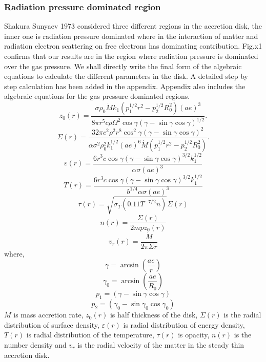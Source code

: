 \documentclass[useAMS,usenatbib]{mn2e}
\begin{document}
\subsubsection{Radiation pressure dominated region}
Shakura Sunyaev 1973 considered three different regions in the accretion disk, the inner one is radiation pressure dominated where in the interaction of matter and radiation electron scattering on free electrons has dominating contribution. Fig.x1 confirms that our results are in the region where radiation pressure is dominated over the gas pressure. We shall directly write the final form of the algebraic equations to calculate the different parameters in the disk. A detailed step by step calculation has been added in the appendix. Appendix also includes the algebraic equations for the gas pressure dominated regions.
\begin{equation}
z_0(r) = \frac{\sigma\rho_0\dot{M}k_1\left(p_1^{1/2}r^2 - p_2^{1/2}R_0^2\right)(ae)^3}{8\pi r^5 c \rho \Omega^2\cos\gamma(\gamma - \sin\gamma\cos\gamma)^{1/2}}.
\end{equation}
\begin{equation}
\Sigma(r) = \frac{32\pi c^2\rho^2 r^8 \cos^2{\gamma}(\gamma - \sin\gamma\cos\gamma)^2}{\alpha\sigma^2\rho_0^2 k_1^{1/2}(ae)^6\dot{M}\left(p_1^{1/2}r^2 - p_2^{1/2}R_0^2\right)}.
\end{equation}
\begin{equation}
\varepsilon(r) = \frac{6 r^3 c \cos\gamma(\gamma - \sin\gamma\cos\gamma)^{3/2}k_1^{1/2}}{\alpha\sigma (ae)^3}
\end{equation}
\begin{equation}
T(r) = \frac{6r^3 c \cos\gamma (\gamma - \sin\gamma\cos\gamma)^{3/2}k_1^{1/2}}{b^{1/4}\alpha\sigma (ae)^3}
\end{equation}
\begin{equation}
\tau (r) = \sqrt{\sigma_T(0.11 T^{-7/2}n)}\Sigma(r)
\end{equation}
\begin{equation}
n(r) = \frac{\Sigma(r)}{2mpz_0(r)}
\end{equation}
\begin{equation}
v_r(r) = \frac{\dot{M}}{2\pi\Sigma r}
\end{equation}
where, 
\begin{equation} 
\gamma = \arcsin(\frac{ae}{r}) 
\end{equation}
\begin{equation}
\gamma_0 = \arcsin(\frac{ae}{R_0})
\end{equation}
\begin{equation}
p_1 = (\gamma - \sin\gamma\cos\gamma)
\end{equation}
\begin{equation}
p_2 = (\gamma_0 - \sin\gamma_0\cos\gamma_0)
\end{equation}
$\dot{M}$ is mass accretion rate, $z_0(r)$ is half thickness of the disk, $\Sigma(r)$ is the radial distribution of surface density, $\varepsilon(r)$ is radial distribution of energy density, $T(r)$ is radial distribution of the temperature, $\tau(r)$ is opacity, $n(r)$ is the number density and $v_r$ is the radial velocity of the matter in the steady thin accretion disk.
\end{document}
